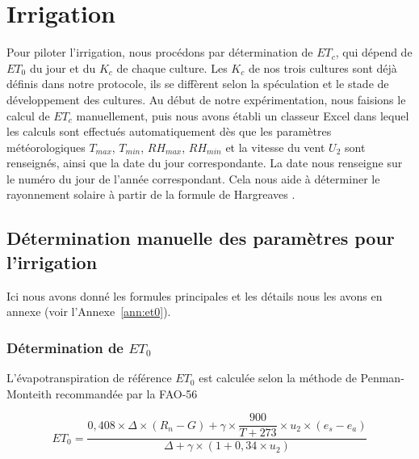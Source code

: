 \section{Irrigation}
Pour piloter l’irrigation, nous procédons par détermination de $ET_c$, qui dépend de $ET_0$ du jour et du $K_c$ de chaque culture. Les $K_c$ de nos trois cultures sont déjà définis dans notre protocole, ils se diffèrent selon la spéculation et le stade de développement des cultures. Au début de notre expérimentation, nous faisions le calcul de $ET_c$ manuellement, puis nous avons établi un classeur Excel dans lequel les calculs sont effectués automatiquement dès que les paramètres météorologiques $T_{max}$, $T_{min}$, $RH_{max}$, $RH_{min}$ et la vitesse du vent $U_2$ sont renseignés, ainsi que la date du jour correspondante. La date nous renseigne sur le numéro du jour de l’année correspondant. Cela nous aide à déterminer le rayonnement solaire à partir de la formule de Hargreaves \cite{koc_reference_2023}.

\subsection{Détermination manuelle des paramètres pour l’irrigation}
Ici nous avons donné les formules principales et les détails nous les avons en annexe (voir l’Annexe~\ref{ann:et0}).
\subsubsection{Détermination de \texorpdfstring{$ET_0$}{ET0}}
L’évapotranspiration de référence $ET_0$ est calculée selon la méthode de Penman-Monteith recommandée par la FAO-56 \cite[chap.~3]{allen_crop_1998-1}

\begin{equation}
    ET_0 = \frac{0{,}408 \times \Delta \times (R_n - G) + \gamma \times \dfrac{900}{T + 273} \times u_2 \times (e_s - e_a)}{\Delta + \gamma \times (1 + 0{,}34 \times u_2)}
    \label{eq:et0_final}
\end{equation}

